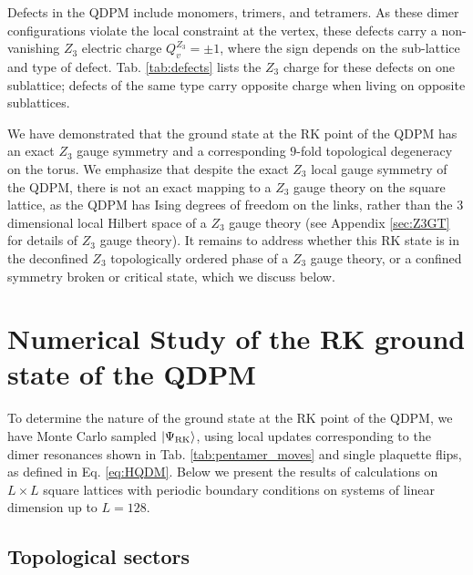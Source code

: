 \documentclass[twocolumn,prb,aps,floatfix,superscriptaddress]{revtex4-1}
\newcommand{\tabref}[1]{Tab. \ref{#1}}
\newcommand{\appref}[1]{Appendix \ref{#1}}
\newcommand{\ket}[1]{| #1 \rangle}
\newcommand{\Eqref}[1]{Eq. \eqref{#1}}
\begin{document}
Defects in the QDPM include monomers, trimers, and tetramers. As these dimer configurations violate the local constraint at the vertex, these defects carry a non-vanishing $Z_3$ electric charge $Q_v^{Z_3} = \pm 1$, where the sign depends on the sub-lattice and type of defect. \tabref{tab:defects} lists the $Z_3$ charge for these defects on one sublattice; defects of the same type carry opposite charge when living on opposite sublattices.

We have demonstrated that the ground state at the RK point of the QDPM has an exact $Z_3$ gauge symmetry and a corresponding $9$-fold topological degeneracy on the torus. We emphasize that despite the exact $Z_3$ local gauge symmetry of the QDPM, there is not an exact mapping to a $Z_3$ gauge theory on the square lattice, as the QDPM has Ising degrees of freedom on the links, rather than the 3 dimensional local Hilbert space of a $Z_3$ gauge theory (see \appref{sec:Z3GT} for details of $Z_3$ gauge theory).  It remains to address whether this RK state is in the deconfined $Z_3$ topologically ordered phase of a $Z_3$ gauge theory, or a confined symmetry broken or critical state, which we discuss below.



\section{Numerical Study of the RK ground state of the QDPM}
\label{sec:numerics}

To determine the nature of the ground state at the RK point of the QDPM, we have Monte Carlo sampled $\ket{\Psi_{\rm{RK}}}$, using local updates corresponding to the dimer resonances shown in \tabref{tab:pentamer_moves} and single plaquette flips, as defined in \Eqref{eq:HQDM}. Below we present the results of calculations on $L\times L$ square lattices with periodic boundary conditions on systems of linear dimension up to $L=128$.

\subsection{Topological sectors}
\end{document}
